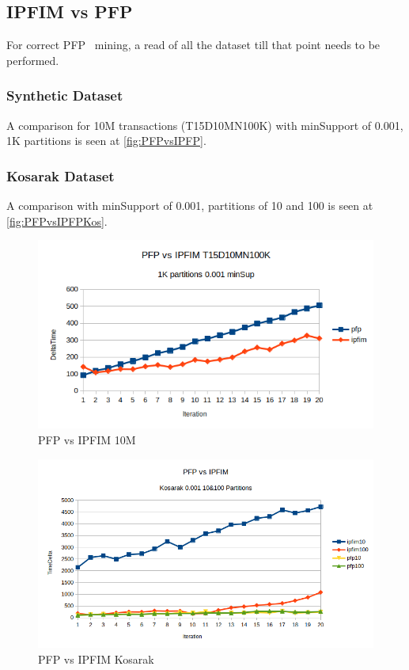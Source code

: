 \subsection{IPFIM vs PFP}
 For correct PFP~\cite{li2008pfp} mining, a read of all the dataset till that point needs to be performed.
\subsubsection{Synthetic Dataset}
A comparison for 10M transactions (T15D10MN100K) with minSupport of 0.001, 1K partitions is seen at \autoref{fig:PFPvsIPFP}.

\subsubsection{Kosarak Dataset}
A comparison with minSupport of 0.001, partitions of 10 and 100 is seen at \autoref{fig:PFPvsIPFPKos}.


\begin{figure}
  \centering
  \includegraphics[width=\linewidth]{figures/PFPvsIPFIM0_001_10M}
  \caption{PFP vs IPFIM 10M}
  \label{fig:PFPvsIPFP}
\end{figure}

\begin{figure}
  \centering
  \includegraphics[width=\linewidth]{figures/PFPvsIPFIM0_001_Kosarak}
  \caption{PFP vs IPFIM Kosarak}
  \label{fig:PFPvsIPFPKos}
\end{figure}


